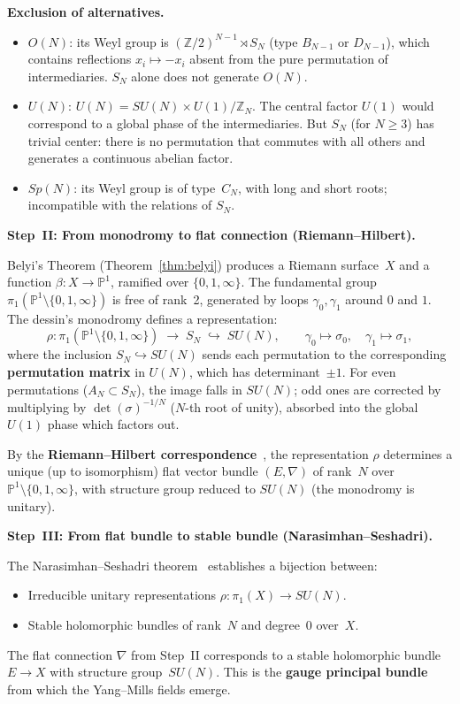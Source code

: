 \smallskip\noindent
\textbf{Exclusion of alternatives.}
\begin{itemize}
  \item $O(N)$: its Weyl group is $(\mathbb{Z}/2)^{N-1} \rtimes S_N$
    (type $B_{N-1}$ or $D_{N-1}$), which contains reflections
    $x_i \mapsto -x_i$ absent from the pure permutation of
    intermediaries. $S_N$ alone does not generate $O(N)$.
  \item $U(N)$: $U(N) = SU(N) \times U(1)/\mathbb{Z}_N$. The
    central factor $U(1)$ would correspond to a global phase of
    the intermediaries. But $S_N$ (for $N \geq 3$) has trivial
    center: there is no permutation that commutes with all
    others and generates a continuous abelian factor.
  \item $Sp(N)$: its Weyl group is of type~$C_N$, with long
    and short roots; incompatible with the relations of $S_N$.
\end{itemize}

\medskip\noindent
\textbf{Step~II: From monodromy to flat connection
(Riemann--Hilbert).}

Belyi's Theorem (Theorem~\ref{thm:belyi}) produces a Riemann
surface~$X$ and a function $\beta \colon X \to \mathbb{P}^1$,
ramified over $\{0, 1, \infty\}$. The fundamental group
$\pi_1(\mathbb{P}^1 \setminus \{0, 1, \infty\})$ is free of
rank~2, generated by loops $\gamma_0, \gamma_1$ around $0$ and
$1$. The dessin's monodromy defines a representation:
\[
  \rho \colon \pi_1(\mathbb{P}^1 \setminus \{0, 1, \infty\})
  \;\longrightarrow\; S_N
  \;\hookrightarrow\; SU(N),
  \qquad
  \gamma_0 \mapsto \sigma_0, \quad \gamma_1 \mapsto \sigma_1,
\]
where the inclusion $S_N \hookrightarrow SU(N)$ sends each
permutation to the corresponding \textbf{permutation matrix}
in $U(N)$, which has determinant~$\pm 1$. For even permutations
($A_N \subset S_N$), the image falls in $SU(N)$; odd ones are
corrected by multiplying by $\det(\sigma)^{-1/N}$ ($N$-th root
of unity), absorbed into the global $U(1)$ phase which factors out.

By the \textbf{Riemann--Hilbert correspondence}~\cite{deligne1970},
the representation $\rho$ determines a unique (up to isomorphism)
flat vector bundle $(E, \nabla)$ of rank~$N$ over
$\mathbb{P}^1 \setminus \{0, 1, \infty\}$, with structure group
reduced to $SU(N)$ (the monodromy is unitary).

\medskip\noindent
\textbf{Step~III: From flat bundle to stable bundle
(Narasimhan--Seshadri).}

The Narasimhan--Seshadri theorem~\cite{narasimhan1965} establishes
a bijection between:
\begin{itemize}
  \item Irreducible unitary representations
    $\rho \colon \pi_1(X) \to SU(N)$.
  \item Stable holomorphic bundles of rank~$N$ and degree~0
    over~$X$.
\end{itemize}
The flat connection $\nabla$ from Step~II corresponds to a stable
holomorphic bundle $E \to X$ with structure group~$SU(N)$. This
is the \textbf{gauge principal bundle} from which the Yang--Mills
fields emerge.

